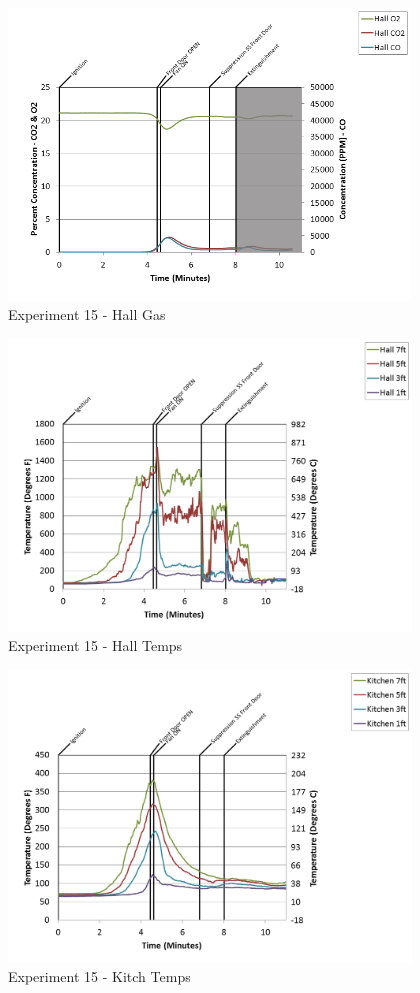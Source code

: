 \documentclass{article}
\begin{document}
\begin{appendices}
\clearpage

\begin{figure}[h!]
	\centering
	\includegraphics[height=3.05in]{0_Images/Results_Charts/Exp_15_Charts/HallGas.png}
	\caption{Experiment 15 - Hall Gas}
\end{figure}


\begin{figure}[h!]
	\centering
	\includegraphics[height=3.05in]{0_Images/Results_Charts/Exp_15_Charts/HallTemps.png}
	\caption{Experiment 15 - Hall Temps}
\end{figure}

\clearpage

\begin{figure}[h!]
	\centering
	\includegraphics[height=3.05in]{0_Images/Results_Charts/Exp_15_Charts/KitchTemps.png}
	\caption{Experiment 15 - Kitch Temps}
\end{figure}



\end{appendices}
\end{document}
